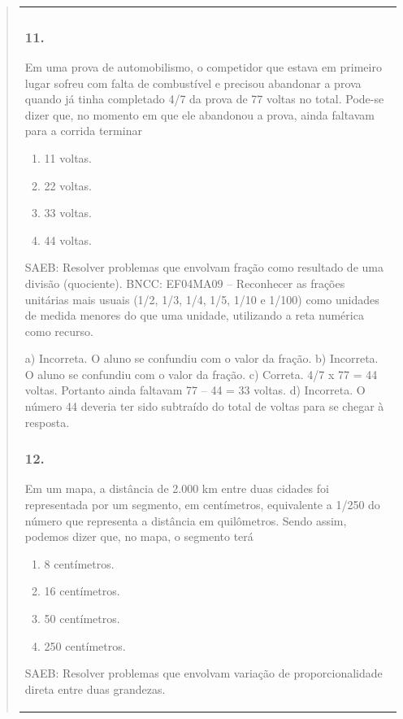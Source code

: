 \begin{mdframed}[linewidth=2pt,linecolor=salmao,roundcorner=2pt]
\begin{itemize}
{\begin{itemize}
\begin{escolha}
{\begin{quote}
{\begin{escolha}
{{{{{\begin{longtable}[]{@{}l@{}}
\begin{itemize}
{\begin{escolha}
\subsubsection{11.}

Em uma prova de automobilismo, o competidor que estava em primeiro lugar
sofreu com falta de combustível e precisou abandonar a prova quando já
tinha completado 4/7 da prova de 77 voltas no total. Pode-se dizer que,
no momento em que ele abandonou a prova, ainda faltavam para a corrida
terminar

\begin{enumerate}
\item
  11 voltas.
\item
  22 voltas.
\item
  33 voltas.
\item
  44 voltas.
\end{enumerate}

SAEB: Resolver problemas que envolvam fração como resultado
de uma divisão (quociente).
BNCC: EF04MA09 -- Reconhecer as frações unitárias mais usuais (1/2, 1/3, 1/4, 1/5, 1/10 e 1/100) como
unidades de medida menores do que uma unidade, utilizando a reta numérica como recurso.

a) Incorreta. O aluno se confundiu com o valor da fração.
b) Incorreta. O aluno se confundiu com o valor da fração.
c) Correta. 4/7 x 77 = 44 voltas. Portanto ainda faltavam 77 -- 44 = 33 voltas.
d) Incorreta. O número 44 deveria ter sido subtraído do total de voltas para se chegar à resposta.

\subsubsection{12.}

Em um mapa, a distância de 2.000 km entre duas cidades foi representada
por um segmento, em centímetros, equivalente a 1/250 do número que
representa a distância em quilômetros. Sendo assim, podemos dizer que, no
mapa, o segmento terá

\begin{enumerate}
\item
  8 centímetros.
\item
  16 centímetros.
\item
  50 centímetros.
\item
  250 centímetros.
\end{enumerate}

SAEB: Resolver problemas que envolvam variação de
proporcionalidade direta entre duas grandezas.


\end{escolha}}
\end{itemize}
\end{longtable}}}}}}
\end{escolha}}
\end{quote}}
\end{escolha}
\end{itemize}}
\end{itemize}
\end{mdframed}
